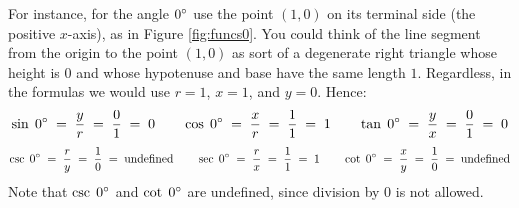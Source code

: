 \begin{exmp}
 For instance, for the angle $0^\circ$ use the point $(1,0)$ on its terminal side (the positive
 $x$-axis), as in Figure \ref{fig:funcs0}. You could think of the line segment from the origin to
 the point $(1,0)$ as sort of a degenerate right triangle whose height is $0$ and whose hypotenuse
 and base have the same length $1$. Regardless, in the formulas we would use $r = 1$, $x = 1$, and
 $y = 0$. Hence:
 \begin{displaymath}
  \sin\;0\Degrees \;=\; \dfrac{y}{r} \;=\; \dfrac{0}{1} \;=\; 0 \qquad
  \cos\;0\Degrees \;=\; \dfrac{x}{r} \;=\; \dfrac{1}{1} \;=\; 1 \qquad
  \tan\;0\Degrees \;=\; \dfrac{y}{x} \;=\; \dfrac{0}{1} \;=\; 0\vspace{1mm}
 \end{displaymath}
 \begin{displaymath}
  \csc\;0\Degrees \;=\; \dfrac{r}{y} \;=\; \dfrac{1}{0} \;=\; \text{undefined}\qquad
  \sec\;0\Degrees \;=\; \dfrac{r}{x} \;=\; \dfrac{1}{1} \;=\; 1 \qquad
  \cot\;0\Degrees \;=\; \dfrac{x}{y} \;=\; \dfrac{1}{0} \;=\; \text{undefined}\vspace{1mm}
 \end{displaymath}
 Note that $\csc\;0^\circ$ and $\cot\;0^\circ$ are undefined, since division by $0$ is not
 allowed.


\end{exmp}

